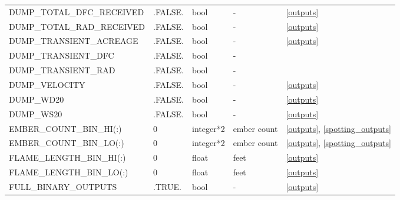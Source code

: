 \begin{landscape}
\begin{center}
\begin{longtable}{lllll}
DUMP\_TOTAL\_DFC\_RECEIVED                   & .FALSE.                    & bool                   & -                                  & \ref{outputs}                        \\
DUMP\_TOTAL\_RAD\_RECEIVED                   & .FALSE.                    & bool                   & -                                  & \ref{outputs}                        \\
DUMP\_TRANSIENT\_ACREAGE                     & .FALSE.                    & bool                   & -                                  & \ref{outputs}                        \\
DUMP\_TRANSIENT\_DFC                         & .FALSE.                    & bool                   & -                                  &  \\
DUMP\_TRANSIENT\_RAD                         & .FALSE.                    & bool                   & -                                  &  \\
DUMP\_VELOCITY                               & .FALSE.                    & bool                   & -                                  & \ref{outputs}                        \\
DUMP\_WD20                                   & .FALSE.                    & bool                   & -                                  & \ref{outputs}                        \\
DUMP\_WS20                                   & .FALSE.                    & bool                   & -                                  & \ref{outputs}                        \\
EMBER\_COUNT\_BIN\_HI(:)                     & 0                          & integer*2              & ember count                        & \ref{outputs}, \ref{spotting_outputs}                       \\
EMBER\_COUNT\_BIN\_LO(:)                     & 0                          & integer*2              & ember count                        & \ref{outputs}, \ref{spotting_outputs}                        \\
FLAME\_LENGTH\_BIN\_HI(:)                    & 0                          & float                  & feet                               & \ref{outputs}                        \\
FLAME\_LENGTH\_BIN\_LO(:)                    & 0                          & float                  & feet                               & \ref{outputs}                        \\
FULL\_BINARY\_OUTPUTS                        & .TRUE.                     & bool                   & -                                  & \ref{outputs}                        \\

\end{longtable}
\end{center}
\end{landscape}

